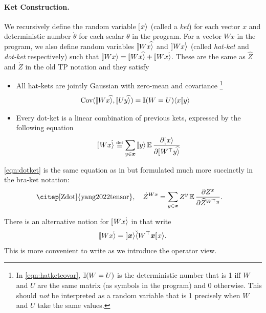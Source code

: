 \documentclass{article}
\theoremstyle{plain}
\theoremstyle{definition}
\begin{document}
\paragraph{Ket Construction.}
We recursively define the random variable $\ket x$ (called a \emph{ket}) for each vector $x$ and deterministic number $\mathring{\theta}$ for each scalar $\theta$ in the program.
For a vector $Wx$ in the program, we also define random variables $\hatket{Wx}$ and $\dotket{Wx}$ (called \emph{hat-ket} and \emph{dot-ket} respectively) such that $\ket{Wx} = \hatket{Wx} + \dotket{Wx}$. These are the same as $\hat{Z}$ and $\dot{Z}$ in the old TP notation \citep{yang2022tensor} and they satisfy
\begin{itemize}

\item[\texttt{Hat}]
All hat-kets
are jointly Gaussian with zero-mean and covariance%
\footnote{In \cref{eqn:hatketcovar}, $\mathbb{I}(W=U)$ is the deterministic number that is 1 iff $W$ and $U$ are the same matrix (as symbols in the program) and 0 otherwise. This should \emph{not} be interpreted as a random variable that is 1 precisely when $W$ and $U$ take the same values.}
\begin{align}
  \Cov(\hatket{Wx}, \hatket{Uy}) &= \ind(W = U)\braket x y \label{eqn:hatketcovar}
\end{align}

\item[\texttt{Dot}] Every dot-ket is a linear combination of previous kets, expressed by the following equation
\begin{equation}
  \dotket{Wx}\defeq \sum_{y \in \xx} \ket{y}\EV \frac{\partial \ket x}{\partial \hatket{W^\trsp y}}\label{eqn:dotket}
\end{equation}
\end{itemize}
\cref{eqn:dotket} is the same equation as in\citep[Zdot]{yang2022tensor} 
but formulated much more succinctly in the bra-ket notation:
\begin{align*}
  \text{\citep[Zdot]{yang2022tensor}},\quad
  \Zdot^{Wx}
  &= \sum_{y \in \xx } Z^{y}\EV \f{\partial Z^x} {\partial \hat Z^{W^\trsp y}}.
\end{align*}

\newcommand\lhatbra[1]{\mkern+3mu\check{\mkern-3mu\langle}#1 \ob}
\newcommand\lhatbraket[2]{\mkern+3mu\check{\mkern-3mu\langle}#1 \ob #2 \rangle}

There is an alternative notion for $\dotket{Wx}$ in \citet{yang2023tensor} that write 
\[\dotket{Wx}=\ket{\xx}\dbra{W^\top \xx}x\ra.\] This is more convenient to write as we introduce the operator view.
\end{document}
